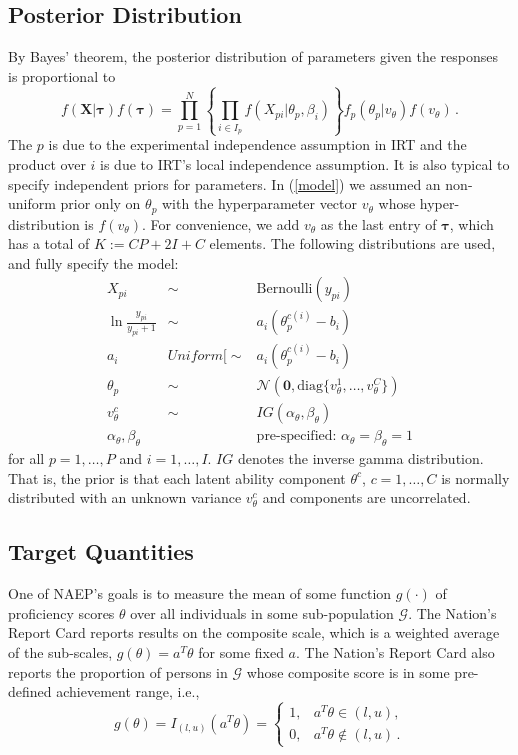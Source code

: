 \documentclass{article}
\newcommand{\Normal}{\mathcal{N}}
\newcommand{\G}{\mathcal{G}}
\newcommand{\bX}{\mathbf{X}}
\newcommand{\bt}{\boldsymbol\tau}
\newcommand{\st}{v_{\ta}}
\newcommand{\ta}{\theta}
\begin{document}
\subsection{Posterior Distribution}
By Bayes' theorem, the posterior distribution of parameters given the responses is proportional to
\begin{equation}
  f(\bX|\bt) f(\bt) = \prod_{p=1}^N \left\{ \prod_{i \in I_p} f(X_{pi}|\ta_p,\beta_i) \right\} f_p(\ta_p|\st) f(\st)\,.
  \label{model}
\end{equation}
The $p$ is due to the experimental independence assumption in IRT and the product over $i$ is due to IRT’s local independence assumption. It is also typical to specify independent priors for parameters. In (\ref{model}) we assumed an non-uniform prior only on $\ta_p$ with the hyperparameter vector $\st$ whose hyper-distribution is $f(\st)$. For convenience, we add $\st$ as the last entry of $\bt$, which has a total of $K := C P + 2 I + C$ elements. The following distributions are used, and fully specify the model:
\begin{eqnarray}
	X_{pi} &\sim& {\mbox{Bernoulli}}(y_{pi})
	\label{dist_x} \\
	\ln \frac{y_{pi}}{y_{pi}+1} &\sim& a_i (\ta_{p}^{c(i)} - b_i)
	\label{dist_y} \\
	a_i & Uniform[\sim& a_i (\ta_{p}^{c(i)} - b_i)
	\label{dist_a} \\
	\ta_p &\sim& \Normal(\mathbf{0}, {\mbox{diag}}\{\st^1,\dots,\st^C\}) 
	\label{dist_ta} \\
	\st^c &\sim& IG(\alpha_{\ta}, \beta_{\ta})
	\label{dist_st} \\
	\alpha_{\ta}, \beta_{\ta} && {\mbox{pre-specified: }} \alpha_{\ta} = \beta_{\ta} = 1
	\label{dist_ab}
\end{eqnarray}
for all $p=1,\dots,P$ and $i=1,\dots,I$. $IG$ denotes the inverse gamma distribution. That is, the prior is that each latent ability component $\ta^c$, $c=1,\dots,C$ is normally distributed with an unknown variance $\st^c$ and components are uncorrelated.

\subsection{Target Quantities}
One of NAEP's goals is to measure the mean of some function $g(\cdot)$ of proficiency scores $\ta$ over all individuals in some sub-population $\G$. The Nation's Report Card reports results on the composite scale, which is a weighted average of the sub-scales, $g(\ta) = a^T \ta$ for some fixed $a$. The Nation's Report Card also reports the proportion of persons in $\G$ whose composite score is in some pre-defined achievement range, i.e.,
\begin{equation}
	g(\ta) = I_{(l,u)}(a^T \ta) =
  \begin{cases}
    1, & a^T \ta \in (l,u), \\
    0, & a^T \ta \not \in (l,u)\,.
  \end{cases}
\end{equation}
\end{document}
